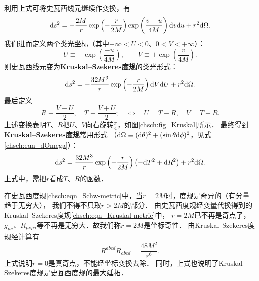 利用上式可将史瓦西线元继续作变换，有
\begin{equation}
    {\rm d}s^2 = - \frac{2M}{r} \exp\left({-\frac{r}{2M}}\right)\exp\left({\frac{v-u}{4M}}\right) 
    {\rm d}v {\rm d}u  + r^2 {\rm d}\Omega.
\end{equation}
我们进而定义两个类光坐标（其中$-\infty< U <0$、$0<V<+\infty $）：
\begin{equation}
    U\equiv -\exp\left({\frac{-u}{4M}}\right) , \qquad
    V\equiv +\exp\left({\frac{v}{4M}}\right) .
\end{equation}
则史瓦西线元变为{\heiti \bfseries Kruskal--Szekeres度规}的类光形式：
\begin{equation}\label{chsch:eqn_Kruskal-metric-light}
    {\rm d}s^2 = -\frac{32M^3}{r} \exp\left({-\frac{r}{2M}}\right)  
    {\rm d}V {\rm d}U  + r^2 {\rm d}\Omega.
\end{equation}
最后定义
\begin{equation}\label{chsch:eqn_RTUV}
    R\equiv \frac{V-U}{2},\quad    T\equiv \frac{V+U}{2};
    \quad \Leftrightarrow \quad     U =T- R, \quad V=T+R.
\end{equation}
上述变换表明$T$、$R$把$U$、$V$向右旋转$\frac{\pi}{4}$，如图\ref{chsch:fig_Kruskal}所示．
最终得到{\heiti \bfseries Kruskal--Szekeres度规}常用形式  
（${\rm d}\Omega\equiv({\rm d}\theta)^2 + (\sin\theta {\rm d}\phi)^2$，见式\eqref{chsch:eqn_dOmega}）：
\begin{equation}\label{chsch:eqn_Kruskal-metric}
    {\rm d}s^2 = \frac{32M^3}{r} \exp\left({-\frac{r}{2M}}\right)  
    \left( -{\rm d}T^2 + {\rm d}R^2 \right)  + r^2 {\rm d}\Omega.
\end{equation}
上式中，需把$r$看成$T$、$R$的函数．

在史瓦西度规\eqref{chsch:eqn_Schw-metric}中，当$r=2M$时，度规是奇异的（有分量趋于无穷大），
我们不得不只取$r>2M$的部分．
由史瓦西度规经变量代换得到的Kruskal--Szekeres度规\eqref{chsch:eqn_Kruskal-metric}中，
$r=2M$已不再是奇点了，$g_{\mu\nu}$、$R_{\mu\nu\rho\sigma}$等不再是无穷大．故我们称$r=2M$是坐标奇性．
由Kruskal--Szekeres度规经计算有
\begin{equation}
    R^{abcd} R_{abcd} = \frac{48 M^2}{r^6} .
\end{equation}
上式说明$r=0$是真奇点，不能经坐标变换去除．
同时，上式也说明了Kruskal--Szekeres度规是史瓦西度规的最大延拓．


